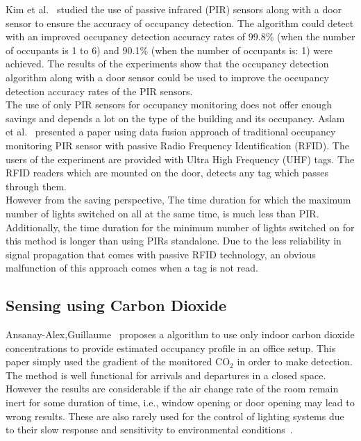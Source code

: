 Kim et al.~\cite{kim2017improved} studied the use of passive infrared (PIR) sensors along with a door sensor to ensure the accuracy of occupancy detection. The algorithm could detect with an improved occupancy detection accuracy rates of 99.8\% (when the number of occupants is 1 to 6) and 90.1\% (when the number of occupants is: 1) were achieved. The results of the experiments show that the occupancy detection algorithm along with a door sensor could be used to improve the occupancy detection accuracy rates of
the PIR sensors.
\\
	


The use of only PIR sensors for occupancy monitoring does not offer enough savings and depends a lot on the type of the building and its occupancy. Aslam et al.~\cite{manzoor2012occupancy} presented a paper using data fusion approach of traditional occupancy monitoring PIR sensor with passive Radio Frequency Identification (RFID).
The users of the experiment are provided with Ultra High Frequency (UHF) tags. The RFID readers which are mounted on the door, detects any tag which passes through them.
\\
However from the saving perspective, The time duration for which the maximum number of lights switched on all at the same time, is much less than PIR. Additionally, the time duration for the minimum number of lights switched on for
this method is longer than using PIRs standalone. Due to the less reliability in signal propagation that comes with passive RFID technology, an obvious malfunction of this approach comes when a tag is not read.
\\



\subsection{Sensing using Carbon Dioxide}


Ansanay-Alex,Guillaume~\cite{ansanay2013estimating} proposes a algorithm to use only indoor carbon dioxide concentrations to provide estimated occupancy profile in an office setup. This paper simply used the gradient of the monitored CO$_{2}$ in order to make detection. The method is well functional for arrivals and departures in a closed space. However the results are considerable if the air change rate of the room remain inert for some duration of time, i.e., window opening or door opening may lead to wrong  results. These are also rarely used for the control of lighting systems due to their slow response and sensitivity to environmental conditions~\cite{teixeira2010survey}.
\\

